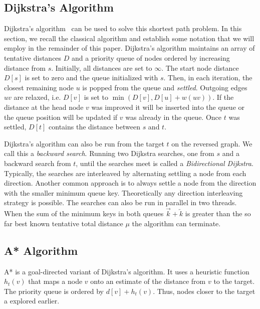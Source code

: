 \documentclass[manuscript,review]{acmart}
\begin{document}
\subsection{Dijkstra's Algorithm}

Dijkstra's algorithm~\cite{d-ntpcg-59} can be used to solve this shortest path problem.
In this section, we recall the classical algorithm and establish some notation that we will employ in the remainder of this paper.
Dijkstra's algorithm maintains an array of tentative distances $D$ and a priority queue of nodes ordered by increasing distance from $s$.
Initially, all distances are set to $\infty$.
The start node distance $D[s]$ is set to zero and the queue initialized with $s$.
Then, in each iteration, the closest remaining node $u$ is popped from the queue and \emph{settled}.
Outgoing edges $uv$ are relaxed, i.e. $D[v]$ is set to $\min(D[v], D[u] + w(uv))$.
If the distance at the head node $v$ was improved it will be inserted into the queue or the queue position will be updated if $v$ was already in the queue.
Once $t$ was settled, $D[t]$ contains the distance between $s$ and $t$.

Dijkstra's algorithm can also be run from the target $t$ on the reversed graph.
We call this a \emph{backward search}.
Running two Dijkstra searches, one from $s$ and a backward search from $t$, until the searches meet is called a \emph{Bidirectional Dijkstra}.
Typically, the searches are interleaved by alternating settling a node from each direction.
Another common approach is to always settle a node from the direction with the smaller minimum queue key.
Theoretically any direction interleaving strategy is possible.
The searches can also be run in parallel in two threads.
When the sum of the minimum keys in both queues $\overrightarrow{k} + \overleftarrow{k}$ is greater than the so far best known tentative total distance $\mu$ the algorithm can terminate.

\subsection{A* Algorithm}\label{sec:a_star}

A* is a goal-directed variant of Dijkstra's algorithm.
It uses a heuristic function $h_t(v)$ that maps a node $v$ onto an estimate of the distance from $v$ to the target.
The priority queue is ordered by $d[v] + h_t(v)$.
Thus, nodes closer to the target a explored earlier.
\end{document}
